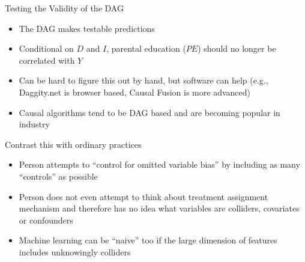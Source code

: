 \documentclass{beamer}
\begin{document}
\begin{frame}
\begin{itemize}
\begin{itemize}
          \end{itemize}
  \end{itemize}
  \framebreak


\end{frame}


\begin{frame}{Testing the Validity of the DAG}

  \begin{itemize}
    \item The DAG makes testable predictions
    \item Conditional on $D$ and $I$, parental education ($PE$) should no longer be correlated with $Y$
    \item Can be hard to figure this out by hand, but software can help (e.g., Daggity.net is browser based, Causal Fusion is more advanced)
    \item Causal algorithms tend to be DAG based and are becoming popular in industry 
  \end{itemize}

  \begin{center}
  \end{center}

\end{frame}




\begin{frame}{Contrast this with ordinary practices}

\begin{itemize}
\item Person attempts to ``control for omitted variable bias'' by including as many ``controls'' as possible
\item Person does not even attempt to think about treatment assignment mechanism and therefore has no idea what variables are colliders, covariates or confounders
\item Machine learning can be ``naive'' too if the large dimension of features includes unknowingly colliders
\end{itemize}

\end{frame}
\end{document}
